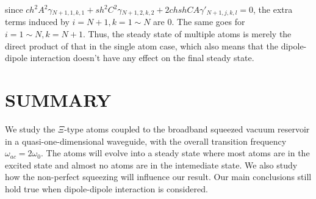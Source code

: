 \documentclass[aps,showpacs,twocolumn,twoside,groupedaddress]{revtex4}
\begin{document}
since $ch^{2}A^{2}\gamma{}_{N+1,1,k,1}+sh^{2}C^{2}\gamma{}_{N+1,2,k,2}+2chshCA\gamma'_{N+1,j,k,l}=0$, the extra terms induced by $i=N+1, k=1\sim N$ are 0. The same goes for $i=1\sim N, k=N+1$. Thus, the steady state of multiple atoms is merely the direct product of that in the single atom case, which also means that the dipole-dipole interaction doesn't have any effect on the final steady state.
\section{SUMMARY}
We study the $\Xi$-type atoms coupled to the broadband squeezed vacuum reservoir in a quasi-one-dimensional waveguide, with the overall transition frequency $\omega_{ac}=2\omega_0$. The atoms will evolve into a steady state where most atoms are in the excited state and almost no atoms are in the intemediate state. We also study how the non-perfect squeezing will influence our result. Our main conclusions still hold true when dipole-dipole interaction is considered.
\end{document}
